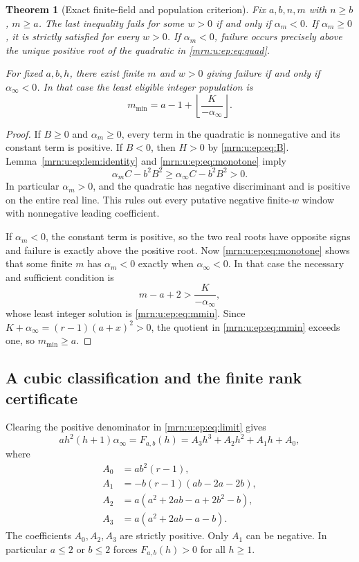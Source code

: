 \documentclass[11pt,a4paper]{article}
\newtheorem{theorem}{Theorem}[section]
\theoremstyle{remark}\newtheorem{remark}[theorem]{Remark}
\begin{document}
\begin{theorem}[Exact finite-field and population criterion]\label{mrn:u:ep:thm:criterion}
Fix $a,b,n,m$ with $n\ge b$, $m\ge a$. The last inequality fails for some $w>0$ if and only if $\alpha_m<0$. If $\alpha_m\ge0$, it is strictly satisfied for every $w>0$. If $\alpha_m<0$, failure occurs precisely above the unique positive root of the quadratic in \eqref{mrn:u:ep:eq:quad}.

For fixed $a,b,h$, there exist finite $m$ and $w>0$ giving failure if and only if $\alpha_\infty<0$. In that case the least eligible integer population is
\begin{equation}\label{mrn:u:ep:eq:mmin}
 m_{\min}=a-1+\left\lfloor\frac{K}{-\alpha_\infty}\right\rfloor.
\end{equation}
\end{theorem}
\begin{proof}
If $B\ge0$ and $\alpha_m\ge0$, every term in the quadratic is nonnegative and its constant term is positive. If $B<0$, then $H>0$ by \eqref{mrn:u:ep:eq:B}. Lemma~\ref{mrn:u:ep:lem:identity} and \eqref{mrn:u:ep:eq:monotone} imply
\[
 \alpha_m C-b^2B^2\ge\alpha_\infty C-b^2B^2>0.
\]
In particular $\alpha_m>0$, and the quadratic has negative discriminant and is positive on the entire real line. This rules out every putative negative finite-$w$ window with nonnegative leading coefficient.

If $\alpha_m<0$, the constant term is positive, so the two real roots have opposite signs and failure is exactly above the positive root. Now \eqref{mrn:u:ep:eq:monotone} shows that some finite $m$ has $\alpha_m<0$ exactly when $\alpha_\infty<0$. In that case the necessary and sufficient condition is
\[
 m-a+2>\frac{K}{-\alpha_\infty},
\]
whose least integer solution is \eqref{mrn:u:ep:eq:mmin}. Since $K+\alpha_\infty=(r-1)(a+x)^2>0$, the quotient in \eqref{mrn:u:ep:eq:mmin} exceeds one, so $m_{\min}\ge a$.
\end{proof}

\subsection{A cubic classification and the finite rank certificate}
Clearing the positive denominator in \eqref{mrn:u:ep:eq:limit} gives
\begin{equation}\label{mrn:u:ep:eq:cubic}
 ah^2(h+1)\alpha_\infty=F_{a,b}(h)
 =A_3h^3+A_2h^2+A_1h+A_0,
\end{equation}
where
\begin{align*}
 A_0&=ab^2(r-1),\\
 A_1&=-b(r-1)(ab-2a-2b),\\
 A_2&=a(a^2+2ab-a+2b^2-b),\\
 A_3&=a(a^2+2ab-a-b).
\end{align*}
The coefficients $A_0,A_2,A_3$ are strictly positive. Only $A_1$ can be negative. In particular $a\le2$ or $b\le2$ forces $F_{a,b}(h)>0$ for all $h\ge1$.
\end{document}
